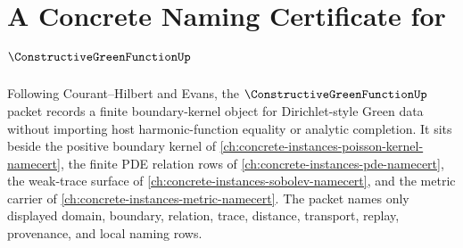 \chapter{A Concrete Naming Certificate for $\ConstructiveGreenFunctionUp$}
\label{ch:concrete-instances-constructive-green-function-namecert}

Following Courant--Hilbert and Evans, the $\ConstructiveGreenFunctionUp$ packet records a finite boundary-kernel object for Dirichlet-style Green data without importing host harmonic-function equality or analytic completion. It sits beside the positive boundary kernel of \autoref{ch:concrete-instances-poisson-kernel-namecert}, the finite PDE relation rows of \autoref{ch:concrete-instances-pde-namecert}, the weak-trace surface of \autoref{ch:concrete-instances-sobolev-namecert}, and the metric carrier of \autoref{ch:concrete-instances-metric-namecert}. The packet names only displayed domain, boundary, relation, trace, distance, transport, replay, provenance, and local naming rows.

